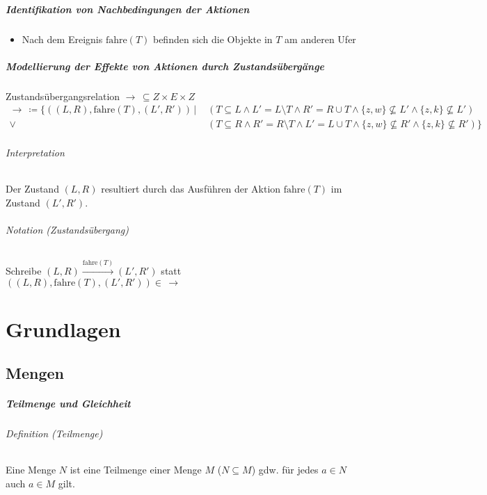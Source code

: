 \documentclass[a4paper, 11pt, accentcolor = tud3b]{tudreport}
\newcommand{\forwhich}{\ensuremath{{\,\vert\,}}}
\newcommand{\definition}[2]{\subparagraph{Definition (#1)} #2}
\newcommand{\notation}[2]{\subparagraph{Notation (#1)} #2}
\begin{document}
			    \paragraph{\textit{Identifikation} von Nachbedingungen der Aktionen}
				    \begin{itemize}
				    	\item Nach dem Ereignis $ \text{fahre}(T) $ befinden sich die Objekte in $ T $ am anderen Ufer
				    \end{itemize}
			    
			    \paragraph{\textit{Modellierung} der Effekte von Aktionen durch Zustandsübergänge}
				    Zustandsübergangsrelation $ \rightarrow\, \subseteq Z \times E \times Z $
				    \begin{align*}
					    \rightarrow\, \coloneqq \{ ((L, R), \text{fahre}(T), (L', R'))\forwhich &\, (T \subseteq L \land L' = L \setminus T \land R' = R \cup T \land \{ z, w \} \not\subseteq L' \land \{ z, k \} \not\subseteq L') \\
						    \lor &\, (T \subseteq R \land R' = R \setminus T \land L' = L \cup T \land \{ z, w \} \not\subseteq R' \land \{ z, k \} \not\subseteq R') \}
				    \end{align*}
				    
				    \subparagraph{Interpretation}
				    Der Zustand $ (L, R) $ resultiert durch das Ausführen der Aktion $ \text{fahre}(T) $ im Zustand $ (L', R') $.
				    
				    \notation{Zustandsübergang}{
				    	Schreibe $ (L, R) \xrightarrow{\text{fahre}(T)} (L', R') $ statt $ ((L, R), \text{fahre}(T), (L', R')) \in \,\rightarrow $
				    }
    
    \chapter{Grundlagen}
    
    	\section{Mengen}
		    \paragraph{Teilmenge und Gleichheit}
			    \definition{Teilmenge}{Eine Menge $ N $ ist eine Teilmenge einer Menge $ M $ ($ N \subseteq M $) gdw. für jedes $ a \in N $ auch $ a \in M $ gilt.}
				
\end{document}
